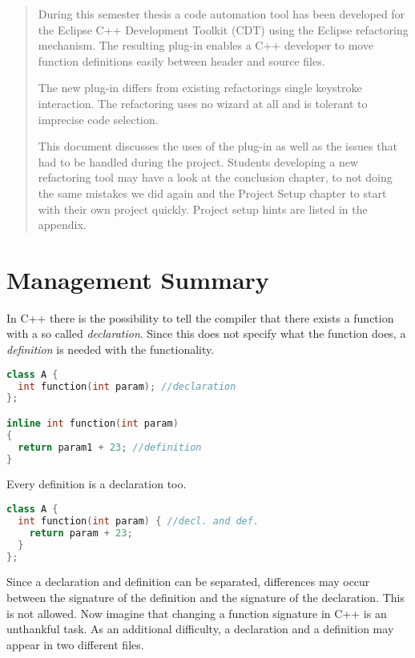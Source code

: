 \begin{abstract}

During this semester thesis a code automation tool has been developed for the 
Eclipse C++ Development Toolkit (CDT) using the Eclipse refactoring mechanism. 
The resulting plug-in enables a C++ developer to move function definitions easily 
between header and source files.

The new plug-in differs from existing refactorings single keystroke interaction. The
refactoring uses no wizard at all and is tolerant to imprecise code selection.

This document discusses the uses of the plug-in as well as the issues that had 
to be handled during the project. Students developing a new refactoring tool
may have a look at the conclusion chapter, to not doing the same mistakes we
did again and the Project Setup chapter to start with their own project quickly.
Project setup hints are listed in the appendix.
\end{abstract}

\chapter*{Management Summary}

In C++ there is the possibility to tell the compiler that there exists a
function with a so called \textit{declaration}. Since
this does not specify what the function does, a \textit{definition} is needed
with the functionality.

\begin{lstlisting}[caption={class with declaration and separated definition},
label={declanddef}, language=C++]
class A {
  int function(int param); //declaration
};

inline int function(int param)
{
  return param1 + 23; //definition
}
\end{lstlisting}

Every definition is a declaration too.

\begin{lstlisting}[caption={class with declaration and definition},
label={defonly}, language=C++]
class A {
  int function(int param) { //decl. and def.
    return param + 23;
  }
};
\end{lstlisting}

Since a declaration and definition can be separated, differences may occur
between the signature of the definition and the signature of the declaration.
This is not allowed. 
Now imagine that changing a function signature in C++ is an unthankful task.
As an additional difficulty, a declaration and a definition may appear in two
different files.

